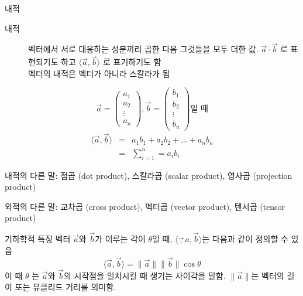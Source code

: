 \documentclass[10pt,t]{beamer}
\begin{document}
\begin{frame}{내적}
\begin{description}
    \item[내적] 벡터에서 서로 대응하는 성분끼리 곱한 다음 그것들을 모두 더한 값. $\vec{a} \cdot \vec{b}$ 로 표현되기도 하고 $\langle \vec{a}, \vec{b} \rangle$ 로 표기하기도 함 \\
    벡터의 내적은 벡터가 아니라 스칼라가 됨
\end{description}
\[\vec{a} = \begin{pmatrix}
    a_1 \\
    a_2 \\
    \vdots \\
    a_n
\end{pmatrix} , \vec{b} = \begin{pmatrix}
    b_1 \\
    b_2 \\
    \vdots \\
    b_n
\end{pmatrix} \text{일 때} \]
\begin{eqnarray*}
    \langle \vec{a}, \vec{b} \rangle &=& a_1 b_1 + a_2 b_2 + \ldots + a_n b_n\\ 
    &=& \sum _{i=1} ^n = a_i b_i
\end{eqnarray*}

내적의 다른 말: 점곱 (dot product), 스칼라곱 (scalar product), 영사곱 (projection product) 

외적의 다른 말: 교차곱 (cross product), 벡터곱 (vector product), 텐서곱 (tensor product)

\pagebreak

\begin{block}{기하학적 특징}
    벡터 $\vec{a}$와 $\vec{b}$가 이루는 각이  $\theta$일 때, $\langle \vec,{a}, \vec{b} \rangle$는 다음과 같이 정의할 수 있음
    \[ \langle \vec{a}, \vec{b} \rangle = \|\vec{a}\| \|\vec{b} \| \cos \theta \]
    이 때 $\theta$ 는 $\vec{a}$와 $\vec{b}$의 시작점을 일치시킬 때 생기는 사이각을 말함. $\|\vec{a}\|$는 벡터의 길이 또는 유클리드 거리를 의미함.
\end{block}

\begin{columns}
    
\end{columns}
\end{frame}
\end{document}
